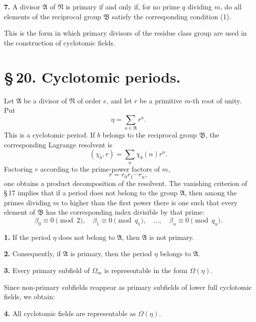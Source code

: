 \documentclass[11pt]{article}
\providecommand{\grpA}{\mathfrak A}
\providecommand{\grpB}{\mathfrak B}
\providecommand{\grpN}{\mathfrak N}
\begin{document}
\medskip
\noindent\textbf{7.} A divisor $\grpA$ of $\grpN$ is primary if and only if, for no prime $q$ dividing $m$, do all elements of the reciprocal group $\grpB$ satisfy the corresponding condition (1).

This is the form in which primary divisors of the residue class group are used in the construction of cyclotomic fields.

\section*{\S\,20. Cyclotomic periods.}

Let $\grpA$ be a divisor of $\grpN$ of order $e$, and let $r$ be a primitive $m$-th root of unity. Put
\begin{equation}
 \eta=\sum_{a\in\grpA} r^a.
\tag{1}
\end{equation}
This is a cyclotomic period. If $b$ belongs to the reciprocal group $\grpB$, the corresponding Lagrange resolvent is
\begin{equation}
 (\chi_b,r)=\sum_n \chi_b(n)r^n.
\tag{2}
\end{equation}
Factoring $r$ according to the prime-power factors of $m$,
\begin{equation}
 r=r_0r_1\cdots r_u,
\tag{12}
\end{equation}
one obtains a product decomposition of the resolvent. The vanishing criterion of \S\,17 implies that if a period does not belong to the group $\grpA$, then among the primes dividing $m$ to higher than the first power there is one such that every element of $\grpB$ has the corresponding index divisible by that prime:
\begin{equation}
 \beta_0\equiv0\pmod2,
 \quad\beta_1\equiv0\pmod {q_1},
 \quad\ldots,
 \quad\beta_u\equiv0\pmod {q_u}.
\tag{15}
\end{equation}

\medskip
\noindent\textbf{1.} If the period $\eta$ does not belong to $\grpA$, then $\grpA$ is not primary.

\medskip
\noindent\textbf{2.} Consequently, if $\grpA$ is primary, then the period $\eta$ belongs to $\grpA$.

\medskip
\noindent\textbf{3.} Every primary subfield of $\Omega_m$ is representable in the form $\Omega(\eta)$.

Since non-primary subfields reappear as primary subfields of lower full cyclotomic fields, we obtain:

\medskip
\noindent\textbf{4.} All cyclotomic fields are representable as $\Omega(\eta)$.
\end{document}
